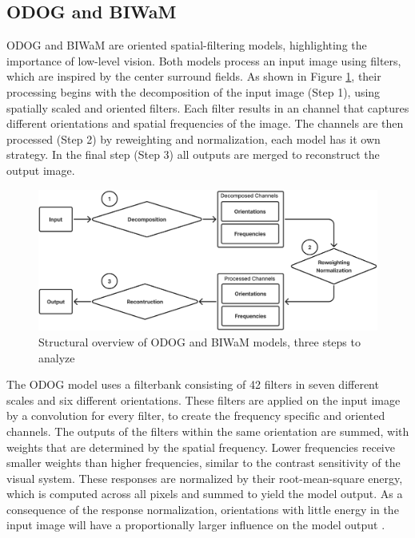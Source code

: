 \subsection{ODOG and BIWaM}

ODOG and BIWaM are oriented spatial-filtering models, highlighting the importance of
low-level vision. Both models process an input image using filters, which are inspired by
the center surround fields. As shown in Figure \ref{fig:figure7}, their processing begins
with the decomposition of the input image (Step 1), using spatially scaled and oriented
filters. Each filter results in an channel that captures different orientations and
spatial frequencies of the image. The channels are then processed (Step 2) by reweighting
and normalization, each model has it own strategy. In the final step (Step 3) all outputs
are merged to reconstruct the output image.

\begin{figure}[H]
    \centering
    \includegraphics[width=\linewidth]{media/model_structure.png}
    \begin{minipage}{0.8\textwidth}
    \caption{Structural overview of ODOG and BIWaM models, three steps to analyze}
    \label{fig:figure7}
    \end{minipage}
\end{figure}

The ODOG model uses a filterbank consisting of 42 filters in seven different scales and
six different orientations. These filters are applied on the input image by a convolution
for every filter, to create the frequency specific and oriented channels. The outputs of
the filters within the same orientation are summed, with weights that are determined by
the spatial frequency. Lower frequencies receive smaller weights than higher frequencies,
similar to the contrast sensitivity of the visual system. These responses are normalized
by their root-mean-square energy, which is computed across all pixels and summed to
yield the model output. As a consequence of the response normalization, orientations with
little energy in the input image will have a proportionally larger influence on the model
output \parencite{Betz2015}.

